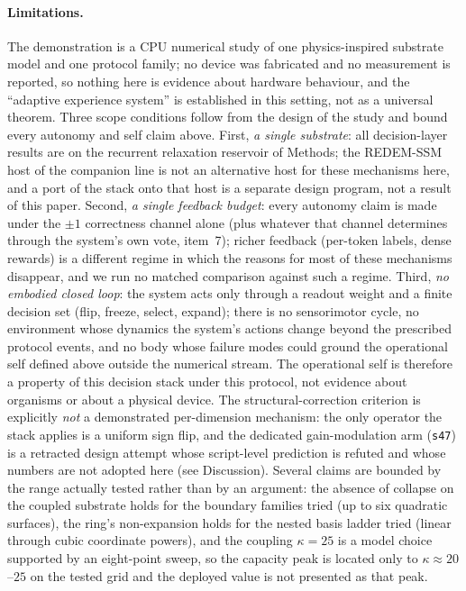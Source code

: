 \documentclass[preprint,12pt]{elsarticle}
\begin{document}
\paragraph{Limitations.} The demonstration is a CPU numerical study of one
physics-inspired substrate model and one protocol family; no device was
fabricated and no measurement is reported, so nothing here is evidence about
hardware behaviour, and the ``adaptive experience system'' is established in
this setting, not as a universal theorem. Three scope conditions follow from
the design of the study and bound every autonomy and self claim above.
First, \emph{a single substrate}: all decision-layer results are on the
recurrent relaxation reservoir of Methods; the REDEM-SSM host of the
companion line is not an alternative host for these mechanisms here, and a
port of the stack onto that host is a separate design program, not a result
of this paper. Second, \emph{a single feedback budget}: every autonomy claim
is made under the $\pm1$ correctness channel alone (plus whatever that
channel determines through the system's own vote, item~7); richer feedback
(per-token labels, dense rewards) is a different regime in which the reasons
for most of these mechanisms disappear, and we run no matched comparison
against such a regime. Third, \emph{no embodied closed loop}: the system
acts only through a readout weight and a finite decision set (flip, freeze,
select, expand); there is no sensorimotor cycle, no environment whose
dynamics the system's actions change beyond the prescribed protocol events,
and no body whose failure modes could ground the operational self defined
above outside the numerical stream. The operational self is therefore a
property of this decision stack under this protocol, not evidence about
organisms or about a physical device. The structural-correction
criterion is explicitly \emph{not} a demonstrated per-dimension mechanism:
the only operator the stack applies is a uniform sign flip, and the
dedicated gain-modulation arm (\texttt{s47}) is a retracted design attempt
whose script-level prediction is refuted and whose numbers are not adopted
here (see Discussion). Several claims are bounded by the
range actually tested rather than by an argument: the absence of collapse on
the coupled substrate holds for the boundary families tried (up to six
quadratic surfaces), the ring's non-expansion holds for the nested basis
ladder tried (linear through cubic coordinate powers), and the coupling
$\kappa=25$ is a model choice supported by an eight-point sweep, so the
capacity peak is located only to $\kappa\approx20$--$25$ on the tested grid
and the deployed value is not presented as that peak.
\end{document}
